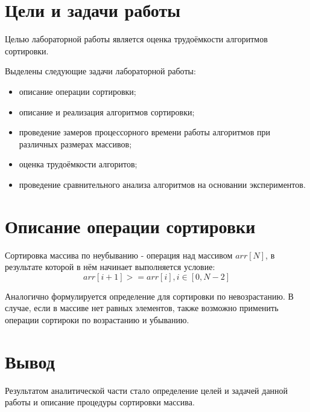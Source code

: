 \section{Цели и задачи работы}
Целью лабораторной работы является оценка трудоёмкости алгоритмов сортировки.

Выделены следующие задачи лабораторной работы:

\begin{itemize}
\item описание операции сортировки;
\item описание и реализация алгоритмов сортировки;
\item проведение замеров процессорного времени работы алгоритмов при различных размерах массивов;
\item оценка трудоёмкости алгоритов;
\item проведение сравнительного анализа алгоритмов на основании экспериментов.
\end{itemize}

\section{Описание операции сортировки}
Сортировка массива по неубыванию - операция над массивом $arr[N]$, в результате которой в нём начинает выполняется условие\cite{sort_def}:
\begin{equation} 
	arr[i+1] >= arr[i], i \in [0, N-2]
\end{equation}

Аналогично формулируется определение для сортировки по невозрастанию. В случае, если в массиве нет равных элементов, также возможно применить операции сортироки по возрастанию и убыванию.

\section*{Вывод}
Результатом аналитической части стало определение целей и задачей данной работы и описание процедуры сортировки массива.
